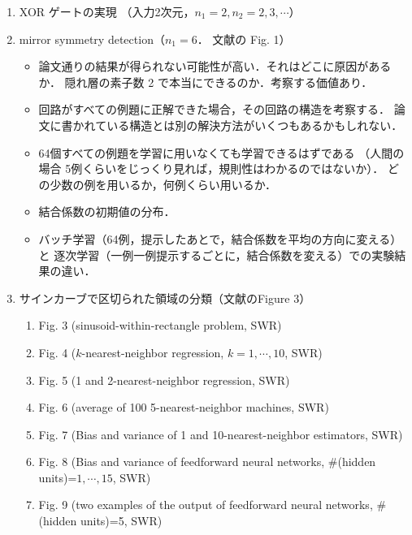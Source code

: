 \documentclass[a4paper,11pt]{jarticle}
\begin{document}
\begin{enumerate}
\item XOR ゲートの実現 （入力2次元，$n_1=2, n_2=2,3,\cdots$）
\item mirror symmetry detection（$n_1=6$． 文献\cite{rumelhart86b}の Fig. 1）
 \begin{itemize}
  \item 論文通りの結果が得られない可能性が高い．それはどこに原因があるか．
	隠れ層の素子数 2 で本当にできるのか．考察する価値あり．
  \item 回路がすべての例題に正解できた場合，その回路の構造を考察する．
	論文に書かれている構造とは別の解決方法がいくつもあるかもしれない．
  \item 64個すべての例題を学習に用いなくても学習できるはずである
	（人間の場合 5例くらいをじっくり見れば，規則性はわかるのではないか）．
	どの少数の例を用いるか，何例くらい用いるか．
		
  \item 結合係数の初期値の分布．
  \item バッチ学習（64例，提示したあとで，結合係数を平均の方向に変える）と
	逐次学習（一例一例提示するごとに，結合係数を変える）での実験結果の違い．
	

 \end{itemize}



 \item サインカーブで区切られた領域の分類（文献\cite{sgeman92a}のFigure 3）

\begin{enumerate}

\item Fig. 3 (sinusoid-within-rectangle problem, SWR)
\item Fig. 4 ($k$-nearest-neighbor regression, $k=1,\cdots,10$, SWR)
\item Fig. 5 (1 and 2-nearest-neighbor regression, SWR)
\item Fig. 6 (average of 100 5-nearest-neighbor machines, SWR)
\item Fig. 7 (Bias and variance of 1 and 10-nearest-neighbor estimators, SWR)
\item Fig. 8 (Bias and variance of feedforward neural networks, \#(hidden units)=$1,\cdots,15$, SWR)
\item Fig. 9 (two examples of the output of feedforward neural networks, \#(hidden units)=5, SWR)
\end{enumerate}

\end{enumerate}
\end{document}
